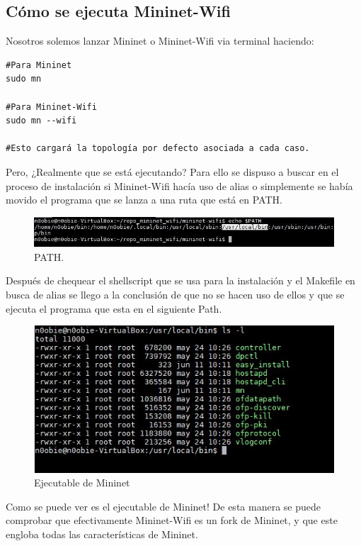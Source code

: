 \subsection{Cómo se ejecuta Mininet-Wifi}
Nosotros solemos lanzar Mininet o Mininet-Wifi via terminal haciendo:
\begin{verbatim}
#Para Mininet
sudo mn 

#Para Mininet-Wifi
sudo mn --wifi

#Esto cargará la topología por defecto asociada a cada caso.
\end{verbatim}
Pero, ¿Realmente que se está ejecutando? Para ello se dispuso a buscar en el proceso de instalación si Mininet-Wifi hacía uso de alias o simplemente se había movido el programa que se lanza a una ruta que está en PATH. \newline
\newline
\begin{figure}[!htb]
  \centering
    \includegraphics[width=\linewidth]{./img/util/1.JPG}
    \caption{PATH.}
  \label{fig:yo}
\end{figure}
\newline
Después de chequear el shellscript que se usa para la instalación y el Makefile en busca de alias se llego a la conclusión de que no se hacen uso de ellos y que se ejecuta el programa que esta en el siguiente Path.
\begin{figure}[!htb]
  \centering
    \includegraphics[width=0.8\linewidth]{./img/util/2.JPG}
    \caption{Ejecutable de Mininet}
  \label{fig:yo}
\end{figure}
\newline
Como se puede ver es el ejecutable de Mininet! De esta manera se puede comprobar que efectivamente Mininet-Wifi es un fork de Mininet, y que este engloba todas las características de Mininet. \newline
